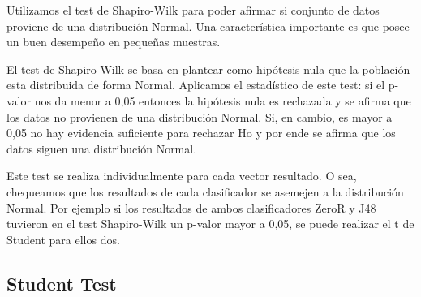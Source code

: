 

Utilizamos el test de Shapiro-Wilk para poder afirmar si conjunto de datos proviene de una distribución Normal. Una característica importante es que posee un buen desempeño en pequeñas muestras.


El test de Shapiro-Wilk se basa en plantear como hipótesis nula que la población esta distribuida de forma Normal. Aplicamos el estadístico de este test: si el p-valor nos da menor a 0,05 entonces la hipótesis nula es rechazada y se afirma que los datos no provienen de una distribución Normal. Si, en cambio, es mayor a 0,05 no hay evidencia suficiente  para rechazar Ho y por ende se afirma que los datos siguen una distribución Normal.

Este test se realiza individualmente para cada vector resultado. O sea, chequeamos que los resultados de cada clasificador se asemejen a la distribución Normal. Por ejemplo si los resultados de ambos clasificadores ZeroR y J48 tuvieron en el test Shapiro-Wilk un p-valor mayor a 0,05, se puede realizar el t de Student para ellos dos. 

\subsection{Student Test}


